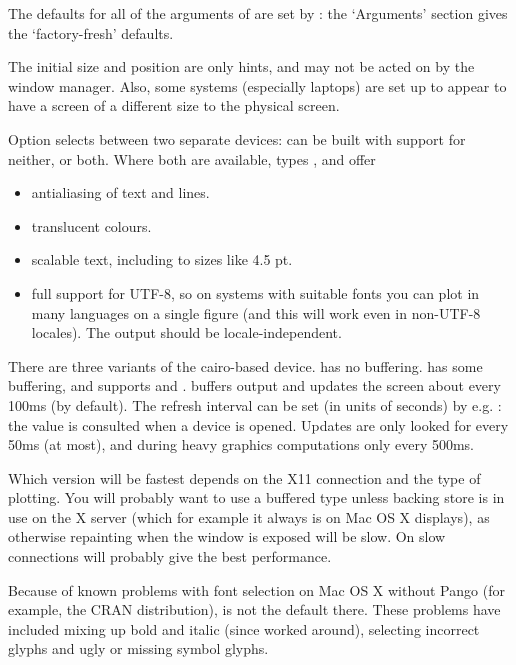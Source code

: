 \begin{Details}\relax
The defaults for all of the arguments of  are set by
: the `Arguments' section gives the
`factory-fresh' defaults.

The initial size and position are only hints, and may not be acted on
by the window manager.  Also, some systems (especially laptops) are
set up to appear to have a screen of a different size to the physical
screen.

Option  selects between two separate devices: \R{} can be
built with support for neither,  or both.  Where
both are available, types ,  and
 offer
\begin{itemize}

\item 
antialiasing of text and lines.
\item 
translucent colours.
\item 
scalable text, including to sizes like 4.5 pt.
\item 
full support for UTF-8, so on systems with suitable fonts you can
plot in many languages on a single figure (and this will work even
in non-UTF-8 locales).  The output should be locale-independent.

\end{itemize}


There are three variants of the cairo-based device.   has no buffering.   has some
buffering, and supports  and .
 buffers output and updates the screen about
every 100ms (by default).  The refresh interval can be set (in units
of seconds) by e.g.  : the
value is consulted when a device is opened.  Updates are only looked
for every 50ms (at most), and during heavy graphics computations only
every 500ms.

Which version will be fastest depends on the X11 connection and the
type of plotting.  You will probably want to use a buffered type
unless backing store is in use on the X server (which for example it
always is on Mac OS X displays), as otherwise repainting when the
window is exposed will be slow.  On slow connections  will probably give the best performance.

Because of known problems with font selection on Mac OS X without
Pango (for example, the CRAN distribution),  is
not the default there.  These problems have included mixing up bold
and italic (since worked around), selecting incorrect glyphs and ugly
or missing symbol glyphs.


\end{Details}
